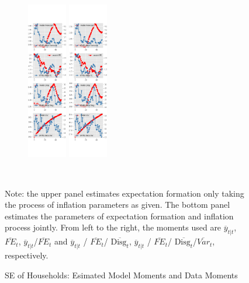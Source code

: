 \documentclass[]{article}
\begin{document}
\begin{figure}[htbp]
\begin{subfigure}[b]{\textwidth}
		\includegraphics[width=0.19\textwidth]{figures/sce_se_est_joint_diag3.png}
		\includegraphics[width=0.19\textwidth]{figures/sce_se_est_joint_diag4.png}
	\end{subfigure}
	\\
	\begin{flushleft}
		{\footnotesize Note: the upper panel estimates expectation formation only taking the process of inflation parameters as given. The bottom panel estimates the parameters of expectation formation and inflation process jointly. From left to the right, the moments used are $\overline y_{t|t}$, $\overline{FE}_{t}$, $\overline y_{t|t}$/$\overline{FE}_{t}$ and $\overline y_{t|t}$ / $\overline{FE}_{t}$/ $\overline{\textrm{Disg}_t}$, $\overline y_{t|t}$ / $\overline{FE}_{t}$/ $\overline{\textrm{Disg}_t}$/$\overline{Var}_t$,  respectively. }
	\end{flushleft}
	\caption{SE of Households: Esimated Model Moments and Data Moments}
\end{figure}
\end{document}
